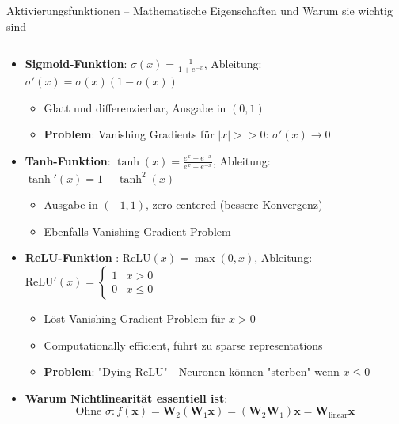 \documentclass[aspectratio=1610, xcolor=dvipsnames, 9pt]{beamer}
\begin{document}
      \begin{frame}{Aktivierungsfunktionen -- Mathematische Eigenschaften und Warum sie wichtig sind}
        \begin{columns}
          \begin{column}{1\textwidth}
            \begin{itemize}
              \item \textbf{Sigmoid-Funktion}: $\sigma(x) = \frac{1}{1 + e^{-x}}$, Ableitung: $\sigma'(x) = \sigma(x)(1-\sigma(x))$
              \begin{itemize}
                \item Glatt und differenzierbar, Ausgabe in $(0,1)$
                \item \textbf{Problem}: Vanishing Gradients für $|x| >> 0$: $\sigma'(x) \to 0$
              \end{itemize}
              \item \textbf{Tanh-Funktion}: $\tanh(x) = \frac{e^x - e^{-x}}{e^x + e^{-x}}$, Ableitung: $\tanh'(x) = 1 - \tanh^2(x)$
              \begin{itemize}
                \item Ausgabe in $(-1,1)$, zero-centered (bessere Konvergenz)
                \item Ebenfalls Vanishing Gradient Problem
              \end{itemize}
              \item \textbf{ReLU-Funktion} \cite{nair2010}: $\text{ReLU}(x) = \max(0,x)$, Ableitung: $\text{ReLU}'(x) = \begin{cases} 1 & x > 0 \\ 0 & x \leq 0 \end{cases}$
              \begin{itemize}
                \item Löst Vanishing Gradient Problem für $x > 0$
                \item Computationally efficient, führt zu sparse representations
                \item \textbf{Problem}: "Dying ReLU" - Neuronen können "sterben" wenn $x \leq 0$
              \end{itemize}
              \item \textbf{Warum Nichtlinearität essentiell ist}:
              \begin{equation}
                \text{Ohne } \sigma: f(\mathbf{x}) = \mathbf{W}_2(\mathbf{W}_1 \mathbf{x}) = (\mathbf{W}_2\mathbf{W}_1)\mathbf{x} = \mathbf{W}_{\text{linear}}\mathbf{x}
              \end{equation}
            \end{itemize}
          \end{column}
        \end{columns}
      \end{frame}
\end{document}
